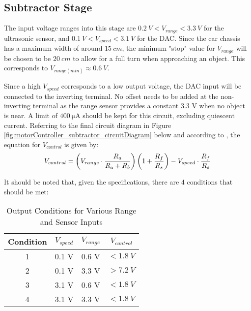 \subsection{Subtractor Stage}
The input voltage ranges into this stage are $\SI{0.2}{V} < V_{range} < \SI{3.3}{V}$ for the ultrasonic sensor, and $\SI{0.1}{V} < V_{speed} < \SI{3.1}{V}$ for the DAC.
Since the car chassis has a maximum width of around $\SI{15}{cm}$, the minimum "stop" value for $V_{range}$ will be chosen to be $\SI{20}{cm}$ to allow for a full turn when approaching an object.
This corresponds to $V_{range(min)} \approx \SI{0.6}{V}$.

Since a high $V_{speed}$ corresponds to a low output voltage, the DAC input will be connected to the inverting terminal. No offset needs to be added at the non-inverting terminal
as the range sensor provides a constant 3.3 V when no object is near. A limit of $\SI{400}{\micro\ampere}$ should be kept for this circuit, excluding quiescent current.
Referring to the final circuit diagram in Figure \ref{fig:motorController_subtractor_circuitDiagram} below and according to \cite{opAmpSumDiff}, the equation for $V_{control}$ is given by:
\begin{equation}{\label{eqn:opAmpSumDiff}}
    V_{control} = \left( V_{range} \cdot \frac{R_a}{R_a + R_b} \right) \left(1 + \frac{R_f}{R_s} \right) - V_{speed} \cdot \frac{R_f}{R_s}
\end{equation}

\noindent It should be noted that, given the specifications, there are 4 conditions that should be met:
\begin{table}[!h]
  \centering
  \renewcommand{\arraystretch}{1.2}
  \begin{tabular}{ |c|c|c|c| }
    \hline
    Condition                 & \textbf{$V_{speed}$}         & \textbf{$V_{range}$}        & \textbf{$V_{control}$}       \\
    \hline
    1                         &  0.1 V                        & 0.6 V                       & $< \SI{1.8}{V}$              \\
    2                         &  0.1 V                        & 3.3 V                       & $> \SI{7.2}{V}$              \\
    3                         &  3.1 V                        & 0.6 V                       & $< \SI{1.8}{V}$              \\
    4                         &  3.1 V                        & 3.3 V                       & $< \SI{1.8}{V}$              \\
    \hline
  \end{tabular}
  \caption{Output Conditions for Various Range and Sensor Inputs}
\end{table}


